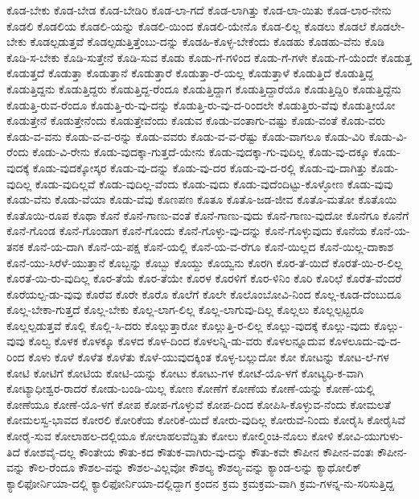 {ಕೊಡ-ಬೇಕು
ಕೊಡ-ಬೇಡ
ಕೊಡ-ಬೇಡಿರಿ
ಕೊಡ-ಲಾ-ಗದೆ
ಕೊಡ-ಲಾಗಿತ್ತು
ಕೊಡ-ಲಾ-ಯಿತು
ಕೊಡ-ಲಾರ-ನೇನು
ಕೊಡಲಿ
ಕೊಡಲಿಯ
ಕೊಡಲಿ-ಯನ್ನು
ಕೊಡಲಿ-ಯಿಂದ
ಕೊಡಲಿ-ಯೇನೊ
ಕೊಡ-ಲಿಲ್ಲ
ಕೊಡಲು
ಕೊಡಲೆ
ಕೊಡಲೇ-ಬೇಕು
ಕೊಡಲ್ಪಡುತ್ತವೆ
ಕೊಡಲ್ಪಡುತ್ತಿತ್ತೆಂಬು-ದನ್ನು
ಕೊಡಹಿ-ಕೊಳ್ಳ-ಬೇಕೆಂದು
ಕೊಡಹು
ಕೊಡಹು-ವೆನು
ಕೊಡಿ
ಕೊಡಿ-ಸ-ಬೇಕು
ಕೊಡಿ-ಸುತ್ತೇನೆ
ಕೊಡಿ-ಸುವ
ಕೊಡು
ಕೊಡು-ಗೆ-ಗಳಿಂದ
ಕೊಡು-ಗೆ-ಗಳೇ
ಕೊಡು-ಗೆ-ಯೆಂದೇ
ಕೊಡುತ್ತ
ಕೊಡುತ್ತದೆ
ಕೊಡುತ್ತಾ
ಕೊಡುತ್ತಾನೆ
ಕೊಡುತ್ತಾರೆ
ಕೊಡುತ್ತಾ-ರೆ-ಯಲ್ಲ
ಕೊಡುತ್ತಾಳೆ
ಕೊಡುತ್ತಿದೆ
ಕೊಡುತ್ತಿದ್ದ
ಕೊಡುತ್ತಿದ್ದನು
ಕೊಡುತ್ತಿದ್ದರು
ಕೊಡುತ್ತಿದ್ದ-ರೆಂದೂ
ಕೊಡುತ್ತಿದ್ದಾಗ
ಕೊಡುತ್ತಿದ್ದಾರೆಯೊ
ಕೊಡುತ್ತಿದ್ದಿರಿ
ಕೊಡುತ್ತಿದ್ದೆನು
ಕೊಡುತ್ತಿ-ರುವ-ರೆಂದೂ
ಕೊಡುತ್ತಿ-ರು-ವು-ದನ್ನು
ಕೊಡುತ್ತಿ-ರು-ವು-ದ-ರಿಂದಲೇ
ಕೊಡುತ್ತಿರು-ವೆವು
ಕೊಡುತ್ತೀಯೋ
ಕೊಡುತ್ತೇನೆ
ಕೊಡುತ್ತೇನೆಂದು
ಕೊಡುತ್ತೇವೆಂದು
ಕೊಡುವ
ಕೊಡು-ವಂತಾಗು-ವಷ್ಟು
ಕೊಡು-ವಂತೆ
ಕೊಡು-ವರು
ಕೊಡು-ವ-ವನು
ಕೊಡು-ವ-ವ-ರನ್ನು
ಕೊಡು-ವವರು
ಕೊಡು-ವ-ವ-ರೆಷ್ಟು
ಕೊಡು-ವಾಗಲೂ
ಕೊಡು-ವಿರಿ
ಕೊಡು-ವಿ-ರೆಂದು
ಕೊಡು-ವಿ-ರೇನು
ಕೊಡು-ವುದಕ್ಕಾ-ಗುತ್ತದೆ-ಯೇನು
ಕೊಡು-ವುದಕ್ಕಾ-ಗು-ವುದಿಲ್ಲ
ಕೊಡು-ವು-ದಕ್ಕೂ
ಕೊಡು-ವುದಕ್ಕೆ
ಕೊಡು-ವುದಕ್ಕೋಸ್ಕರ
ಕೊಡು-ವು-ದನ್ನು
ಕೊಡು-ವು-ದರ
ಕೊಡು-ವು-ದ-ರಲ್ಲಿ
ಕೊಡು-ವು-ದಾಗಿತ್ತು
ಕೊಡು-ವುದಿಲ್ಲ
ಕೊಡು-ವುದಿಲ್ಲವೆ
ಕೊಡು-ವುದಿಲ್ಲ-ವೆಂದು
ಕೊಡು-ವುದು
ಕೊಡು-ವುದೆಂದಿಟ್ಟು-ಕೊಳ್ಳೋಣ
ಕೊಡು-ವುವು
ಕೊಡು-ವೆನು
ಕೊಡು-ವೆಯಾ
ಕೊಡು-ವೆವು
ಕೊಣಪಣ
ಕೊತೂ
ಕೊತೊ-ಜಡ-ಜೀವ
ಕೊತೊ-ಮತೋ
ಕೊತೊಯಿ
ಕೊತೊಯಿ-ರೂಪ
ಕೊಥಾ
ಕೊನೆ
ಕೊನೆ-ಗಾಣು-ವಂತೆ
ಕೊನೆ-ಗಾಣು-ವುದು
ಕೊನೆ-ಗಾಣು-ವುದೋ
ಕೊನೆಗೂ
ಕೊನೆಗೆ
ಕೊನೆ-ಗೊಂಡ
ಕೊನೆ-ಗೊಂಡಾಗ
ಕೊನೆ-ಗೊಂದು
ಕೊನೆ-ಗೊಳ್ಳು-ವು-ದನ್ನು
ಕೊನೆ-ಗೊಳ್ಳುವುದು
ಕೊನೆಯ
ಕೊನೆ-ಯ-ತನಕ
ಕೊನೆ-ಯ-ದಾಗಿ
ಕೊನೆ-ಯ-ಪಕ್ಷ
ಕೊನೆ-ಯಲ್ಲಿ
ಕೊನೆ-ಯ-ವ-ರೆಗೂ
ಕೊನೆ-ಯಿಲ್ಲದ
ಕೊನೆ-ಯಿಲ್ಲ-ದಾಕಾಶ
ಕೊನೆ-ಯು-ಸಿರೆಳೆ-ಯುತ್ತಾನೆ
ಕೊಬ್ಬನ್ನು
ಕೊಬ್ಬು
ಕೊಯ್ದು
ಕೊಯ್ವನು
ಕೊರಗಿ
ಕೊರ-ತೆ-ಯಿದೆ
ಕೊರತೆ-ಯಿ-ರ-ಲಿಲ್ಲ
ಕೊರತೆ-ಯಿ-ರು-ವುದಿಲ್ಲ
ಕೊರ-ತೆಯೆ
ಕೊರ-ತೆಯೇ
ಕೊರಳ
ಕೊರಳಿಗೆ
ಕೊರ-ಳಿನಿಂ
ಕೊರಿ
ಕೊರಿಛೆ
ಕೊರೆತ-ವೆಂದರೆ
ಕೊರೆಯಲ್ಪ-ಡು-ವುವು
ಕೊರೆವ
ಕೊರೇ
ಕೊರೊ
ಕೊಲೆಗೆ
ಕೊಲೇ
ಕೊಲೊಂಬೋವಿ-ನಿಂದ
ಕೊಲ್ಲ-ಕೂಡ-ದೆಂಬುದೂ
ಕೊಲ್ಲ-ಬೇಕಾ-ಗುತ್ತದೆ
ಕೊಲ್ಲ-ಬೇಕು
ಕೊಲ್ಲ-ಲಾಗ-ಲಿಲ್ಲ
ಕೊಲ್ಲ-ಲಾಗುವು-ದಿಲ್ಲ
ಕೊಲ್ಲಲು
ಕೊಲ್ಲಲ್ಪಟ್ಟರೂ
ಕೊಲ್ಲಲ್ಪಡುತ್ತವೆ
ಕೊಲ್ಲಿ
ಕೊಲ್ಲಿ-ಸಿ-ದರು
ಕೊಲ್ಲುತ್ತಾರೋ
ಕೊಲ್ಲುತ್ತಿ-ರ-ಲಿಲ್ಲ
ಕೊಲ್ಲು-ವುದಕ್ಕೆ
ಕೊಲ್ಲು-ವುದು
ಕೊಲ್ಲು-ವುವು
ಕೊಲ್ವ
ಕೊಳಕ
ಕೊಳಕ್ಕೂ
ಕೊಳದ
ಕೊಳ-ದಿಂದ
ಕೊಳಲನ್ನಿ-ಡು-ವರು
ಕೊಳಲನ್ನೂದುವ
ಕೊಳಲೂದು-ವು-ದ-ರಿಂದ
ಕೊಳು
ಕೊಳೆ
ಕೊಳೆತ
ಕೊಳೆತು
ಕೊಳೆ-ಯುವುದಕ್ಕಿಂತ
ಕೊಳ್ಳ-ಬಲ್ಲುದೋ
ಕೋ
ಕೋಟನ್ನು
ಕೋಟ-ಲೆ-ಗಳ
ಕೋಟಿ
ಕೋಟಿಗೆ
ಕೋಟಿಯ
ಕೋಟಿ-ಯನ್ನು
ಕೋಟು
ಕೋಟು-ಗಳ
ಕೋಟೆ-ಯೊ-ಳಗೆ
ಕೋಟ್ಯಧಿ-ಕ-ವಾಗಿ
ಕೋಟ್ಯಾಧೀಶ್ವರ-ರಾದರೆ
ಕೋಡು-ಬಂಡಿ-ಯಿಲ್ಲ
ಕೋಣ
ಕೋಣೆಗೆ
ಕೋಣೆಯ
ಕೋಣೆ-ಯನ್ನು
ಕೋಣೆ-ಯಲ್ಲಿ
ಕೋಣೆಯೂ
ಕೋಣೆ-ಯೊ-ಳಗೆ
ಕೋಪ
ಕೋಪ-ಗೊಳ್ಳುವೆ
ಕೋಪ-ದಿಂದ
ಕೋಪಿಸಿ-ಕೊಳ್ಳುವ-ನೆಂದು
ಕೋಮಲತೆ
ಕೋಮಲಸ್ವ-ಭಾವದ
ಕೋರಲಿ
ಕೋರಿಕೆಯ
ಕೋರಿಕೆ-ಯಿದೆ
ಕೋರು-ವುದಿಲ್ಲ
ಕೋರುವೆ-ನಿಂದು
ಕೋರೈಸಿ
ಕೋರೈಸಿವೆ
ಕೋರೈ-ಸುವ
ಕೋಲಾಹಲ-ದಲ್ಲಿಯೂ
ಕೋಲಾಹಲವೆದ್ದಿತು
ಕೋಲು
ಕೋಲ್ಮಿಂಚಿ-ನೊಲು
ಕೋಳಿ
ಕೋವಿ-ಯುಗುಳು-ತಿದೆ
ಕೋಶವೈ-ದಲ್ಲ
ಕೌಂತೇಯ
ಕೌತು-ಕದ
ಕೌತುಕ-ವಾಗಿರು-ವು-ದನ್ನು
ಕೌತು-ಕವೇ
ಕೌಪೀನ
ಕೌಪೀನ-ವಂತಃ
ಕೌಪೀನ-ವನ್ನು
ಕೌಲ-ರೆಂದೂ
ಕೌಶಲ-ವನ್ನು
ಕೌಶಲ-ವಿಲ್ಲವೋ
ಕೌಶಲ್ಯ
ಕೌಶಲ್ಯ-ವನ್ನು
ಕ್ಯಾಂಡ-ಲನ್ನು
ಕ್ಯಾಥೋಲಿಕ್
ಕ್ಯಾಲಿಫೋರ್ನಿಯಾ-ದಲ್ಲಿ
ಕ್ಯಾಲಿಫೋರ್ನಿಯಾ-ದಲ್ಲಿದ್ದಾಗ
ಕ್ರಂದನ
ಕ್ರಮ
ಕ್ರಮಕ್ರಮ-ವಾಗಿ
ಕ್ರಮ-ಗಳನ್ನ-ನು-ಸರಿಸುತ್ತಿದ್ದ
}
